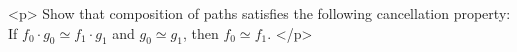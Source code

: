 <p>
    Show that composition of paths satisfies the following cancellation property: If $f_0 \cdot g_0 \simeq f_1 \cdot
    g_1$ and $g_0 \simeq g_1$, then $f_0 \simeq f_1$.
</p>